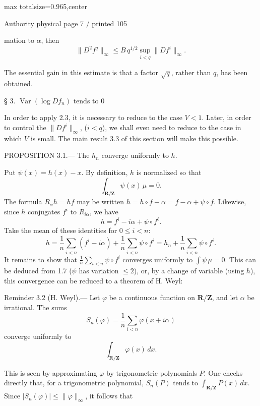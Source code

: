 \documentclass{article}
\begin{document}
\newpage
\noindent\begin{adjustbox}{max totalsize={\textwidth}{0.965\textheight},center}\begin{minipage}{\textwidth}
\noindent\hfill\scriptsize Authority physical page 7 / printed 105\par\normalsize
mation to \(\alpha\), then
\[
\|D^2f^q\|_\infty\leq B\,q^{1/2}\sup_{i<q}\|Df^i\|_\infty.
\]

The essential gain in this estimate is that a factor \(\sqrt q\), rather than \(q\), has been obtained.

§ 3. \(\operatorname{Var}(\log Df_n)\) tends to \(0\)

In order to apply 2.3, it is necessary to reduce to the case \(V<1\). Later, in order to control the \(\|Df^i\|_\infty\), (\(i<q\)), we shall even need to reduce to the case in which \(V\) is small. The main result 3.3 of this section will make this possible.

PROPOSITION 3.1.— The \(h_n\) converge uniformly to \(h\).

Put \(\psi(x)=h(x)-x\). By definition, \(h\) is normalized so that
\[
\int_{\mathbf R/\mathbf Z}\psi(x)\,\mu=0.
\]
The formula \(R_\alpha h=hf\) may be written \(h=h\circ f-\alpha=f-\alpha+\psi\circ f\). Likewise, since \(h\) conjugates \(f^i\) to \(R_{i\alpha}\), we have
\[
h=f^i-i\alpha+\psi\circ f^i.
\]
Take the mean of these identities for \(0\leq i<n\):
\[
h=\frac1n\sum_{i<n}(f^i-i\alpha)+\frac1n\sum_{i<n}\psi\circ f^i
=h_n+\frac1n\sum_{i<n}\psi\circ f^i.
\]
It remains to show that \(\frac1n\sum_{i<n}\psi\circ f^i\) converges uniformly to \(\int\psi\,\mu=0\). This can be deduced from 1.7 (\(\psi\) has variation \(\leq2\)), or, by a change of variable (using \(h\)), this convergence can be reduced to a theorem of H. Weyl:

Reminder 3.2 (H. Weyl).— Let \(\varphi\) be a continuous function on \(\mathbf R/\mathbf Z\), and let \(\alpha\) be irrational. The sums
\[
S_n(\varphi)=\frac1n\sum_{i<n}\varphi(x+i\alpha)
\]
converge uniformly to
\[
\int_{\mathbf R/\mathbf Z}\varphi(x)\,dx.
\]

This is seen by approximating \(\varphi\) by trigonometric polynomials \(P\). One checks directly that, for a trigonometric polynomial, \(S_n(P)\) tends to \(\int_{\mathbf R/\mathbf Z}P(x)\,dx\). Since \(|S_n(\varphi)|\leq\|\varphi\|_\infty\), it follows that
\end{minipage}\end{adjustbox}
\end{document}
